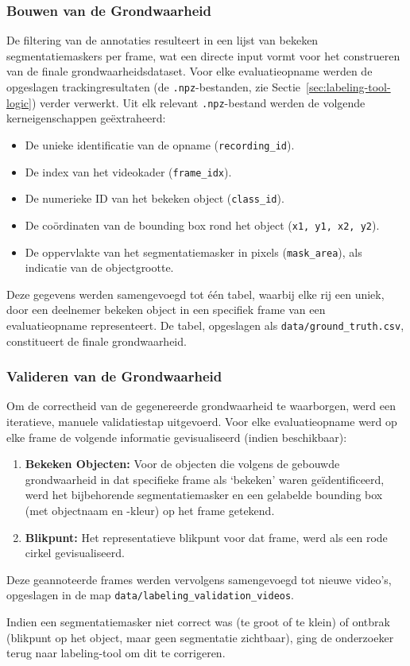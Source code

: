 \subsubsection{Bouwen van de Grondwaarheid}

De filtering van de annotaties resulteert in een lijst van bekeken segmentatiemaskers per frame,
wat een directe input vormt voor het construeren van de finale grondwaarheidsdataset.
Voor elke evaluatieopname werden de opgeslagen trackingresultaten 
(de \texttt{.npz}-bestanden, zie Sectie~\ref{sec:labeling-tool-logic}) verder verwerkt. 
Uit elk relevant \texttt{.npz}-bestand werden de volgende kerneigenschappen geëxtraheerd:
\begin{itemize}
  \item De unieke identificatie van de opname (\texttt{recording\_id}).
  \item De index van het videokader (\texttt{frame\_idx}).
  \item De numerieke ID van het bekeken object (\texttt{class\_id}).
  \item De coördinaten van de bounding box rond het object (\texttt{x1, y1, x2, y2}).
  \item De oppervlakte van het segmentatiemasker in pixels (\texttt{mask\_area}), als indicatie van de objectgrootte.
\end{itemize}

Deze gegevens werden samengevoegd tot één tabel, waarbij elke rij een uniek, door een deelnemer bekeken object 
in een specifiek frame van een evaluatieopname representeert. 
De tabel, opgeslagen als \texttt{data/ground\_truth.csv}, constitueert de finale grondwaarheid.

\subsubsection{Valideren van de Grondwaarheid}

Om de correctheid van de gegenereerde grondwaarheid te waarborgen, werd een iteratieve, manuele validatiestap uitgevoerd.
Voor elke evaluatieopname werd op elke frame de volgende informatie gevisualiseerd (indien beschikbaar):
\begin{enumerate}
  \item \textbf{Bekeken Objecten:} Voor de objecten die volgens de gebouwde grondwaarheid in dat specifieke frame als `bekeken' 
  waren geïdentificeerd, werd het bijbehorende segmentatiemasker en een gelabelde bounding box (met objectnaam en -kleur) op het frame getekend.
  \item \textbf{Blikpunt:} Het representatieve blikpunt voor dat frame, werd als een rode cirkel gevisualiseerd.
\end{enumerate}
Deze geannoteerde frames werden vervolgens samengevoegd tot nieuwe video's, opgeslagen in de map \texttt{data/labeling\_validation\_videos}. 

Indien een segmentatiemasker niet correct was (te groot of te klein) of ontbrak (blikpunt op het object, maar geen segmentatie zichtbaar),
ging de onderzoeker terug naar labeling-tool om dit te corrigeren.